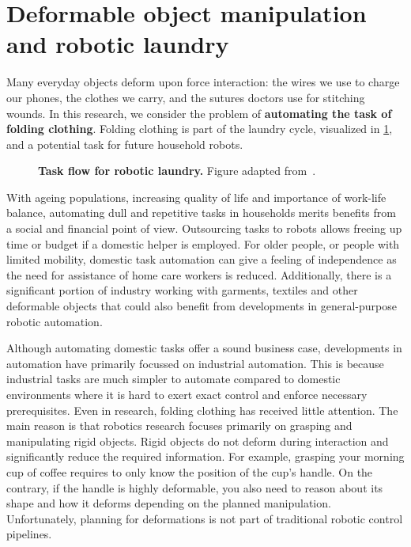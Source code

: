 \documentclass[\home/main.tex]{subfiles}
\begin{document}
\section{Deformable object manipulation and robotic laundry}
Many everyday objects deform upon force interaction: the wires we use to charge our phones, the clothes we carry, and the sutures doctors use for stitching wounds.
In this research, we consider the problem of \textbf{automating the task of folding clothing}. Folding clothing is part of the laundry cycle, visualized in \cref{fig:intro_laundry_cycle}, and a potential task for future household robots.
\begin{figure}[htbp]
    \centering
    
    \caption[Task flow for robotic laundry.]{\textbf{Task flow for robotic laundry.} Figure adapted from~\autocite{Hamajima1996}.}
    \label{fig:intro_laundry_cycle}
\end{figure}
With ageing populations, increasing quality of life and importance of work-life balance, automating dull and repetitive tasks in households merits benefits from a social and financial point of view. Outsourcing tasks to robots allows freeing up time or budget if a domestic helper is employed. For older people, or people with limited mobility, domestic task automation can give a feeling of independence as the need for assistance of home care workers is reduced.
Additionally, there is a significant portion of industry working with garments, textiles and other deformable objects that could also benefit from developments in general-purpose robotic automation.

Although automating domestic tasks offer a sound business case, developments in automation have primarily focussed on industrial automation. This is because industrial tasks are much simpler to automate compared to domestic environments where it is hard to exert exact control and enforce necessary prerequisites. Even in research, folding clothing has received little attention. The main reason is that robotics research focuses primarily on grasping and manipulating rigid objects. Rigid objects do not deform during interaction and significantly reduce the required information. For example, grasping your morning cup of coffee requires to only know the position of the cup's handle.
On the contrary, if the handle is highly deformable, you also need to reason about its shape and how it deforms depending on the planned manipulation. Unfortunately, planning for deformations is not part of traditional robotic control pipelines.
\end{document}
